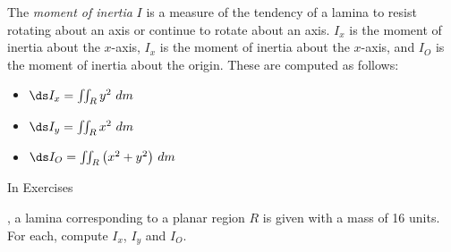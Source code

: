 {The \textit{moment of inertia} $I$ is a measure of the tendency of a lamina to resist rotating about an axis or continue to rotate about an axis. $I_x$ is the moment of inertia about the $x$-axis, $I_x$ is the moment of inertia about the $x$-axis, and $I_O$ is the moment of inertia about the origin. These are computed as follows:
\begin{itemize}
	\item $\ds I_x = \iint_R y^2\ dm$
	\item	$\ds I_y = \iint_R x^2\ dm$
	\item	$\ds I_O = \iint_R \big(x^2+y^2\big)\ dm$
\end{itemize} \noindent In Exercises} 
{,  a lamina corresponding to a planar region $R$ is given with a mass of 16 units. For each, compute $I_x$, $I_y$ and $I_O$.
}
